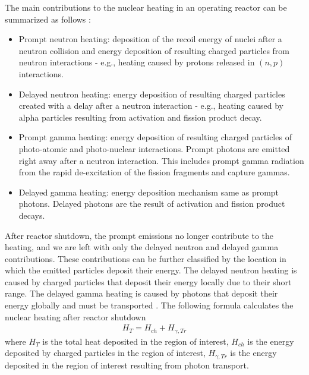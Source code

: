 \documentclass{style/nseJournal}
\begin{document}
The main contributions to the nuclear heating in an operating reactor can be summarized as follows \cite{lemaire_estimation_2015}:
\begin{itemize}
  \item Prompt neutron heating: deposition of the recoil energy of nuclei after a neutron collision and energy deposition of resulting charged particles from neutron interactions - e.g., heating caused by protons released in $(n,p)$ interactions.
  \item Delayed neutron heating: energy deposition of resulting charged particles created with a delay after a neutron interaction - e.g., heating caused by alpha particles resulting from activation and fission product decay.
  \item Prompt gamma heating: energy deposition of resulting charged particles of photo-atomic and photo-nuclear interactions. Prompt photons are emitted right away after a neutron interaction. This includes prompt gamma radiation from the rapid de-excitation of the fission fragments and capture gammas.
  \item Delayed gamma heating: energy deposition mechanism same as prompt photons. Delayed photons are the result of activation and fission product decays.
\end{itemize}

After reactor shutdown, the prompt emissions no longer contribute to the heating, and we are left with only the delayed neutron and delayed gamma contributions.
These contributions can be further classified by the location in which the emitted particles deposit their energy.
The delayed neutron heating is caused by charged particles that deposit their energy locally due to their short range.
The delayed gamma heating is caused by photons that deposit their energy globally and must be transported \cite{peterson-droogh_current_2018}.
The following formula calculates the nuclear heating after reactor shutdown
\begin{align}
H_{T} = H_{ch} + H_{\gamma, Tr} \label{eq:heat}
\end{align}
where $H_{T}$ is the total heat deposited in the region of interest, $H_{ch}$ is the energy deposited by charged particles in the region of interest, $H_{\gamma, Tr}$ is the energy deposited in the region of interest resulting from photon transport.
\end{document}
